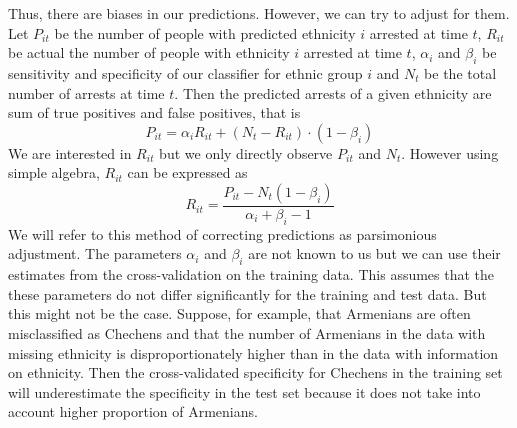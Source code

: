 Thus, there are biases in our predictions. However, we can try to adjust for them. Let $P_{it}$ be the number of people with predicted ethnicity $i$ arrested at time $t$, $R_{it}$ be actual the number of people with ethnicity $i$ arrested at time $t$, $\alpha_i$ and $\beta_i$  be sensitivity and specificity of our classifier for ethnic group $i$ and $N_t$ be the total number of arrests at time $t$. Then the predicted arrests of a given ethnicity are sum of true positives and false positives, that is
\begin{equation}
    P_{it} = \alpha_i R_{it} + \left( N_t - R_{it} \right) \cdot \left(1 - \beta_i \right)  
\end{equation}
We are interested in $R_{it}$ but we only directly observe $P_{it}$ and $N_t$. However using simple algebra, $R_{it}$ can be expressed as
\begin{equation} \label{eq:pars_adj}
 R_{it} = \frac{P_{it} - N_t  \left(1 - \beta_i \right)}{\alpha_i + \beta_i - 1}
\end{equation}
We will refer to this method of correcting predictions as parsimonious adjustment.  The parameters $\alpha_i$ and $\beta_i$ are not known to us but we can use their estimates from the cross-validation on the training data. This assumes that the these parameters do not differ significantly for the training and test data. But this might not be the case. 
Suppose, for example, that Armenians are often misclassified as Chechens and that the number of Armenians in the data with missing ethnicity  is disproportionately higher than in the data with information on ethnicity. 
Then the cross-validated specificity for Chechens in the training set will underestimate the specificity in the test set because it does not take into account higher proportion of Armenians. 

